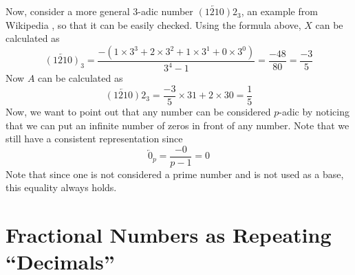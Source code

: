 \documentclass[times,twocolumn,final]{elsarticle}
\begin{document}
Now, consider a more general $3$-adic number $ \overleftarrow{(1210)}2_3$, an example from Wikipedia \cite{wiki2024p-adic}, so that it can be easily checked. Using the formula above, $X$ can be calculated as
$$
\overleftarrow{(1210)}_3 =\frac{-(1\times 3^3 + 2\times 3^2 + 1\times 3^1 + 0 \times 3^0 )}{3^4-1} = \frac{-48}{80} = \frac{-3}{5}
$$
Now $A$ can be calculated as
$$\overleftarrow{(1210)}2_3 = \frac{-3}{5} \times 3 1 + 2 \times 3 0 = \frac{1}{5} $$
Now, we want to point out that any number can be considered $p$-adic by noticing that we can put an infinite number of zeros in front of any number. Note that we still have a consistent representation since
$$
\overleftarrow{0}_p =\frac{-0}{p-1} = 0
$$
Note that since one is not considered a prime number and is not used as a base, this equality always holds. 

\section{Fractional Numbers as Repeating ``Decimals'' }
\label{sec_appendix_fractional_numbers}
\end{document}

